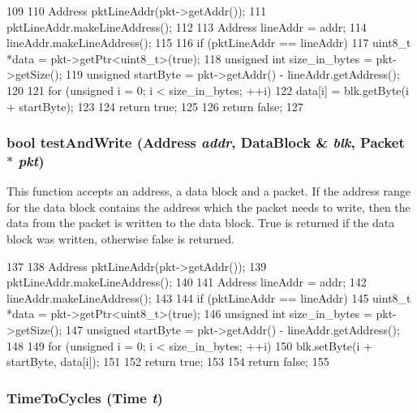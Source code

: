 \begin{DoxyCode}
109 {
110     Address pktLineAddr(pkt->getAddr());
111     pktLineAddr.makeLineAddress();
112 
113     Address lineAddr = addr;
114     lineAddr.makeLineAddress();
115 
116     if (pktLineAddr == lineAddr) {
117         uint8_t *data = pkt->getPtr<uint8_t>(true);
118         unsigned int size_in_bytes = pkt->getSize();
119         unsigned startByte = pkt->getAddr() - lineAddr.getAddress();
120 
121         for (unsigned i = 0; i < size_in_bytes; ++i) {
122             data[i] = blk.getByte(i + startByte);
123         }
124         return true;
125     }
126     return false;
127 }
\end{DoxyCode}
\hypertarget{RubySlicc__Util_8hh_afb1f6e13327ac7be7fc8f3886453bba0}{
\subsubsection[{testAndWrite}]{\setlength{\rightskip}{0pt plus 5cm}bool testAndWrite ({\bf Address} {\em addr}, \/  {\bf DataBlock} \& {\em blk}, \/  {\bf Packet} $\ast$ {\em pkt})}}
\label{RubySlicc__Util_8hh_afb1f6e13327ac7be7fc8f3886453bba0}
This function accepts an address, a data block and a packet. If the address range for the data block contains the address which the packet needs to write, then the data from the packet is written to the data block. True is returned if the data block was written, otherwise false is returned. 


\begin{DoxyCode}
137 {
138     Address pktLineAddr(pkt->getAddr());
139     pktLineAddr.makeLineAddress();
140 
141     Address lineAddr = addr;
142     lineAddr.makeLineAddress();
143 
144     if (pktLineAddr == lineAddr) {
145         uint8_t *data = pkt->getPtr<uint8_t>(true);
146         unsigned int size_in_bytes = pkt->getSize();
147         unsigned startByte = pkt->getAddr() - lineAddr.getAddress();
148 
149         for (unsigned i = 0; i < size_in_bytes; ++i) {
150             blk.setByte(i + startByte, data[i]);
151         }
152         return true;
153     }
154     return false;
155 }
\end{DoxyCode}
\hypertarget{RubySlicc__Util_8hh_a66423efa415e5d2f9721444631d64b1d}{
\subsubsection[{TimeToCycles}]{ TimeToCycles ({\bf Time} {\em t})}}
\label{RubySlicc__Util_8hh_a66423efa415e5d2f9721444631d64b1d}



